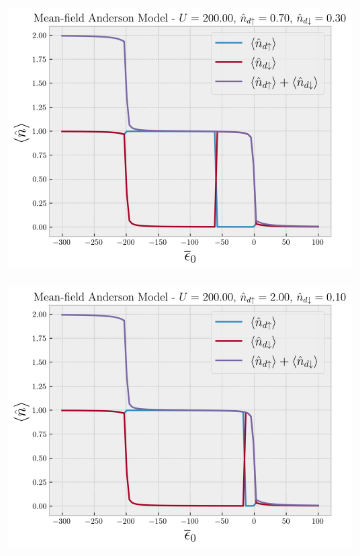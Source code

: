 \documentclass[a4paper,fleqn,12pt]{article}
\begin{document}
\begin{figure}[H]
\centering
\begin{subfigure}{.5\textwidth}
  \centering
  \includegraphics[width=\linewidth]{fig/plot-U_200-up_0.7-down_0.30.png}
\end{subfigure}%
\begin{subfigure}{.5\textwidth}
  \centering
  \includegraphics[width=\linewidth]{fig/plot-U_200-up_2.0-down_0.10.png}
\end{subfigure}
\end{figure}
\end{document}
